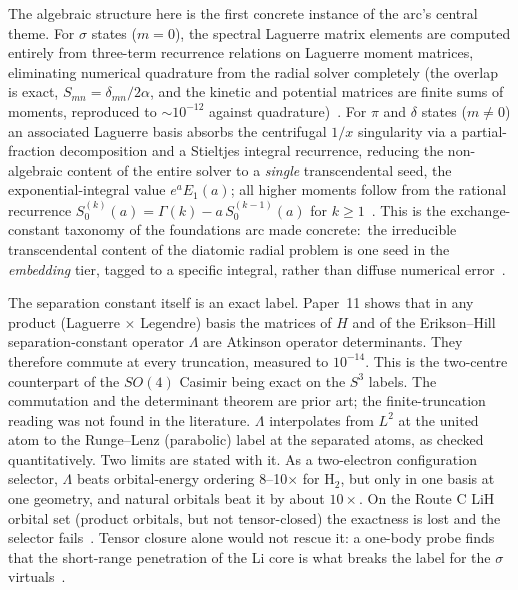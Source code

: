 \documentclass[aps,pra,twocolumn,superscriptaddress,longbibliography]{revtex4-2}
\begin{document}
The algebraic structure here is the first concrete instance of the
arc's central theme.  For $\sigma$ states ($m=0$), the spectral
Laguerre matrix elements are computed entirely from three-term
recurrence relations on Laguerre moment matrices, eliminating numerical
quadrature from the radial solver completely (the overlap is exact,
$S_{mn} = \delta_{mn}/2\alpha$, and the kinetic and potential matrices
are finite sums of moments, reproduced to $\sim\!10^{-12}$ against
quadrature)~\cite{loutey_paper11}.  For $\pi$ and $\delta$ states
($m \neq 0$) an associated Laguerre basis absorbs the centrifugal $1/x$
singularity via a partial-fraction decomposition and a Stieltjes
integral recurrence, reducing the non-algebraic content of the entire
solver to a \emph{single} transcendental seed, the exponential-integral
value $e^a E_1(a)$; all higher moments follow from the rational
recurrence $S_0^{(k)}(a) = \Gamma(k) - a\,S_0^{(k-1)}(a)$ for $k \ge
1$~\cite{loutey_paper11}.  This is the exchange-constant taxonomy of the
foundations arc made concrete:\ the irreducible transcendental content
of the diatomic radial problem is one seed in the \emph{embedding}
tier, tagged to a specific integral, rather than diffuse numerical
error~\cite{loutey_paper18}.

The separation constant itself is an exact label. Paper~11 shows that in
any product (Laguerre $\times$ Legendre) basis the matrices of $H$ and of
the Erikson--Hill separation-constant operator $\Lambda$ are Atkinson
operator determinants. They therefore commute at every truncation,
measured to $10^{-14}$. This is the two-centre counterpart of the
$SO(4)$ Casimir being exact on the $S^3$ labels. The commutation and the
determinant theorem are prior art; the finite-truncation reading was not
found in the literature. $\Lambda$ interpolates from $L^2$ at the united
atom to the Runge--Lenz (parabolic) label at the separated atoms, as
checked quantitatively. Two limits are stated with it. As a two-electron
configuration selector, $\Lambda$ beats orbital-energy ordering
8--10$\times$ for H$_2$, but only in one basis at one geometry, and
natural orbitals beat it by about $10\times$. On the Route C LiH orbital set
(product orbitals, but not tensor-closed) the exactness is lost and the selector
fails~\cite{loutey_paper11}. Tensor closure alone would not rescue it: a
one-body probe finds that the short-range penetration of the Li core is what
breaks the label for the $\sigma$ virtuals~\cite{loutey_paper11,loutey_paper19}.

\end{document}
